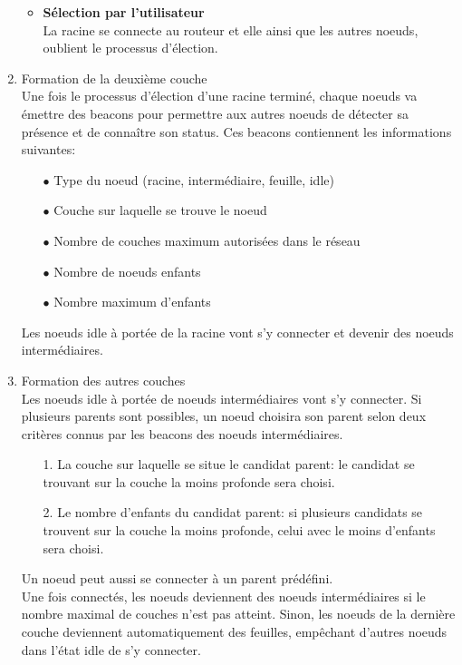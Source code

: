 \documentclass[a4paper, 12pt]{report}
\begin{document}
\begin{enumerate}
\begin{itemize}
                    \item \textbf{Sélection par l'utilisateur}\\
                        La racine se connecte au routeur et elle ainsi que les autres noeuds, oublient le processus
                        d'élection.
                \end{itemize}
            \item Formation de la deuxième couche\\
                Une fois le processus d'élection d'une racine terminé, chaque noeuds va émettre des beacons
                pour permettre aux autres noeuds de détecter sa présence et de connaître son status.
                Ces beacons contiennent les informations suivantes:
                \begin{itemize}
                    \item[$\bullet$] Type du noeud (racine, intermédiaire, feuille, idle)
                    \item[$\bullet$] Couche sur laquelle se trouve le noeud
                    \item[$\bullet$] Nombre de couches maximum autorisées dans le réseau
                    \item[$\bullet$] Nombre de noeuds enfants
                    \item[$\bullet$] Nombre maximum d'enfants   
                \end{itemize}
                Les noeuds idle à portée de la racine vont s'y connecter et devenir des noeuds intermédiaires.
            
            \item Formation des autres couches\\
                Les noeuds idle à portée de noeuds intermédiaires vont s'y connecter. Si plusieurs parents
                sont possibles, un noeud choisira son parent selon deux critères connus par les beacons des noeuds intermédiaires.
                \begin{enumerate}
                    \addtolength{\itemindent}{1cm}
                    \item[1.] La couche sur laquelle se situe le candidat parent:
                        le candidat se trouvant sur la couche la moins profonde sera choisi. 
                    \item[2.] Le nombre d'enfants du candidat parent: si plusieurs candidats se trouvent
                        sur la couche la moins profonde, celui avec le moins d'enfants sera choisi. 
                \end{enumerate}
                
                Un noeud peut aussi se connecter à un parent prédéfini.\\

                Une fois connectés, les noeuds deviennent des noeuds intermédiaires si le nombre maximal de couches n'est pas atteint.
                Sinon, les noeuds de la dernière couche deviennent automatiquement
                des feuilles, empêchant d'autres noeuds dans l'état idle de s'y connecter.

        \end{enumerate}
\end{document}

